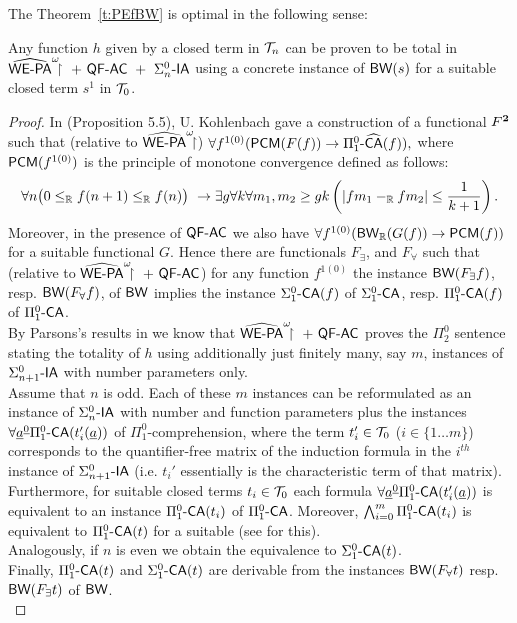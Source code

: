The Theorem~\ref{t:PEfBW} is optimal in the following sense:
%
\begin{prop}\label{p:optPEfBW}
Any function $h$ given by a closed term in $\mathcal{T}_n$ can be proven to be total
in $\hrrwepa\ +\ \QFm\AC\ +\ \Sigma^0_n\usftext{-IA}$ using a concrete 
instance of
$\textsf{\upshape BW}(s)$ for a suitable closed term $s^1$ in $\mathcal{T}_0$.
\end{prop}
\begin{proof}

In \cite{Kohlenbach00} (Proposition 5.5), U. Kohlenbach gave a 
construction of a
functional $F^\mathbf{2}$ such that 
(relative to $\widehat{\textsf{\upshape WE-PA}}^\omega\!\!\!\restriction$) $\forall 
f^{1(0)}(\textsf{\upshape PCM}(F(f))\rightarrow\Pi^0_1\textsf{\upshape -}\widehat{\textsf{\upshape CA}}(f)),$ 
where $\textsf{\upshape PCM}(f^{1(0)})$ is the principle of 
monotone convergence defined as follows:
\[
\forall n\big(0\leq_{\mathbb{R}} f(n+1)\leq_{\mathbb{R}} f(n)\big)\ \rightarrow 
       \exists g\forall k\forall m_1,m_2\geq gk
\left(|fm_1-_{\mathbb{R}} fm_2|\leq\frac{1}{k+1}\right)
\text{.}
\]
 Moreover, in the presence of $\textsf{\upshape QF-}\textsf{\upshape AC}$
we also have $\forall f^{1(0)}( \textsf{\upshape BW}_{\mathbb{R}}(G(f)) \rightarrow\textsf{\upshape PCM}(f) )$ for a 
suitable functional $G.$ 
Hence there are functionals $F_\exists$, and $F_\forall$ such that 
(relative to $\hrrwepa\ +\ \QFm\AC$) for any
function $f^{1(0)}$ the instance $\textsf{\upshape BW}(F_\exists f)$, resp. $\textsf{\upshape BW}(F_\forall f)$, 
of $\textsf{\upshape BW}$ implies the instance $\Sigma^0_1\textsf{\upshape -}\textsf{\upshape CA}(f)$ of $\Sigma^0_1\textsf{\upshape -}\textsf{\upshape CA}$, 
resp. $\Pi^0_1\textsf{\upshape -}\textsf{\upshape CA}(f)$ of $\Pi^0_1\textsf{\upshape -}\textsf{\upshape CA}$.\\ 
By Parsons's results in \cite{Parsons72} we know that
$\hrrwepa\ +\ \QFm\AC$ proves the $\Pi^0_2$ sentence stating
the totality of $h$ using additionally just finitely many, say $m$, instances
of $\Sigma^0_{n+1}\textsf{\upshape -IA}$ with number parameters only.\\
%
Assume that $n$ is odd. Each of these $m$ instances
can be reformulated 
as an instance of $\Sigma^0_{n}\textsf{\upshape -IA}$ with number and 
function parameters plus the instances 
$\forall \underline a^{\underline0} \Pi^0_1\textsf{\upshape -}\textsf{\upshape CA}(t_i'(\underline a))$ of $\Pi^0_1$-comprehension, 
where the term $t_i'\in\mathcal{T}_0$ ($i\in\{1\ldots m\}$) corresponds to the 
quantifier-free matrix of the induction formula in the $i^{th}$ instance of 
$\Sigma^0_{n+1}\textsf{\upshape -IA}$ (i.e. $t_i'$ essentially is the characteristic 
term of that matrix). 
Furthermore, for suitable closed terms $t_i\in\mathcal{T}_0$
 each formula $\forall \underline a^{\underline0} \Pi^0_1\textsf{\upshape -}\textsf{\upshape CA}(t_i'(\underline a))$ is
equivalent to an instance $\Pi^0_1\textsf{\upshape -}\textsf{\upshape CA}(t_i)$ of $\Pi^0_1\textsf{\upshape -}\textsf{\upshape CA}$.
Moreover, $\bigwedge^{m}_{i=0} \Pi^0_1\textsf{\upshape -}\textsf{\upshape CA}(t_i)$ is 
equivalent to $\Pi^0_1\textsf{\upshape -}\textsf{\upshape CA}(t)$ for a suitable \tsn (see \cite{Kohlenbach96} for 
this).\\
Analogously, if $n$ is even we obtain the equivalence to $\Sigma^0_1\textsf{\upshape -}\textsf{\upshape CA}(t)$.\\
Finally, $\Pi^0_1\textsf{\upshape -}\textsf{\upshape CA}(t)$ and $\Sigma^0_1\textsf{\upshape -}\textsf{\upshape CA}(t)$ are
derivable from the instances $\textsf{\upshape BW}(F_\forall t)$ resp. $\textsf{\upshape BW}(F_\exists t)$ of 
$\textsf{\upshape BW}$.\\
\end{proof} 

